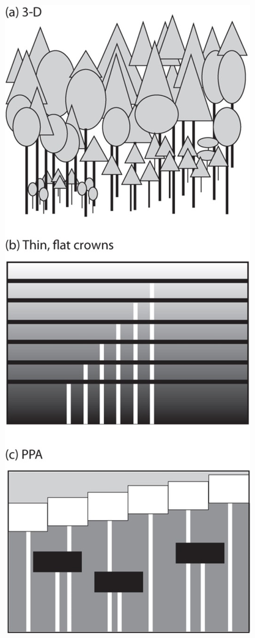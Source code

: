 \documentclass[12pt,oneside]{book}
\begin{document}
\begin{figure}

{\centering \includegraphics[width=0.8\linewidth]{figures/chap6/f627_light_comp} 

}
\end{figure}
\end{document}
